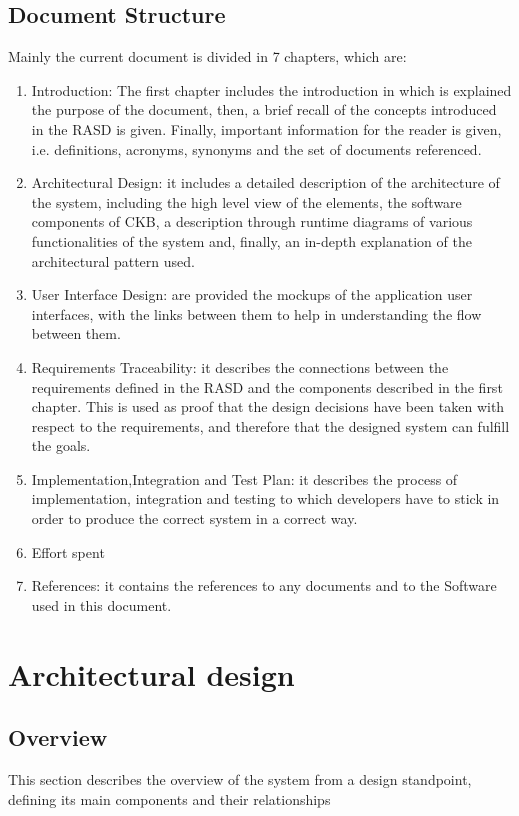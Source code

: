 \documentclass{article}
\begin{document}
\subsection{Document Structure}
Mainly the current document is divided in 7 chapters, which are:\\
\begin{enumerate}
\item Introduction: The first chapter includes the introduction in which is explained
the purpose of the document, then, a brief recall of the concepts introduced in
the RASD is given. Finally, important information for the reader is given, i.e.
definitions, acronyms, synonyms and the set of documents referenced.
\item Architectural Design: it includes a detailed description of the architecture of
the system, including the high level view of the elements, the software
components of CKB, a description through runtime diagrams of various
functionalities of the system and, finally, an in-depth explanation of the
architectural pattern used.
\item User Interface Design: are provided the mockups of the application user
interfaces, with the links between them to help in understanding the flow
between them.
\item Requirements Traceability: it describes the connections between the
requirements defined in the RASD and the components described in the first
chapter. This is used as proof that the design decisions have been taken with
respect to the requirements, and therefore that the designed system can fulfill
the goals.
\item Implementation,Integration and Test Plan: it describes the process of
implementation, integration and testing to which developers have to stick in
order to produce the correct system in a correct way.
\item Effort spent
\item References: it contains the references to any documents and to the Software
used in this document.

\end{enumerate}

\newpage
\section{Architectural design}
\subsection{Overview}
This section describes the overview of the system from a design standpoint, defining its main components and their relationships
\end{document}
